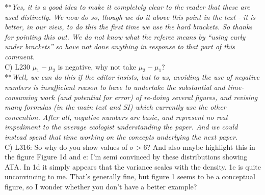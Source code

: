 \documentclass[letterpaper,11pt]{article}
\begin{document}
\noindent ***\emph{Yes, it is a good idea to make it completely clear to the reader that these are 
used distinctly. We now do so, though we do it above this point in the text - it is better, in our view,
to do this the first time we use the hard brackets. So thanks for pointing this out.
We do not know what the referee means by ``using curly under brackets'' so have not done anything
in response to that part of this comment.} \\

\noindent C) L230 $\mu_1-\mu_2$ is negative, why not take $\mu_2-\mu_1$? \\

\noindent ***\emph{Well, we can do this if the editor insists, but to us, avoiding the use of
negative numbers is insufficient reason to have to undertake the substantial and time-consuming 
work (and potential for error) 
of re-doing several figures, and revising many formulas (in the main text and SI) which currently use the other convention.
After all, negative numbers are basic, and represent no real impediment to the average ecologist understanding the 
paper. And we could instead spend that time working on the concepts underlying the next paper.} \\

\noindent C) L316: So why do you show values of $\sigma >6$? And also maybe highlight this in the figure Figure 1d and e: I’m semi convinced by these distributions showing ATA. In 1d it simply appears that the variance scales with the density. 1e is quite unconvincing to me. That’s generally fine, but figure 1 seems to be a conceptual figure, so I wonder whether you don’t have a better example? \\
\end{document}
